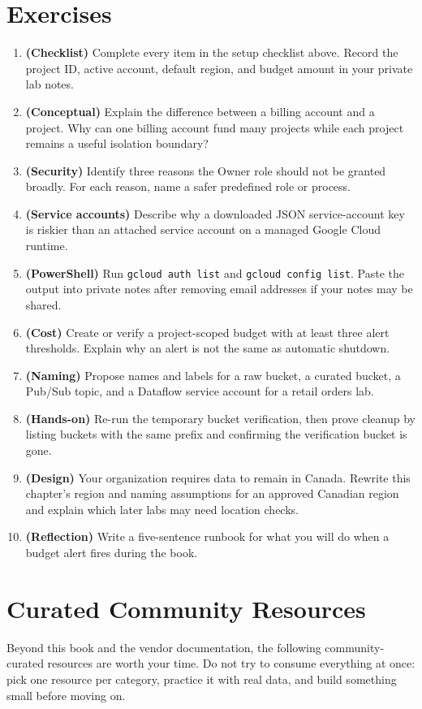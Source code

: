 \section{Exercises}
\begin{enumerate}
    \item \textbf{(Checklist)} Complete every item in the setup checklist above. Record the project ID, active account, default region, and budget amount in your private lab notes.
    \item \textbf{(Conceptual)} Explain the difference between a billing account and a project. Why can one billing account fund many projects while each project remains a useful isolation boundary?
    \item \textbf{(Security)} Identify three reasons the Owner role should not be granted broadly. For each reason, name a safer predefined role or process.
    \item \textbf{(Service accounts)} Describe why a downloaded JSON service-account key is riskier than an attached service account on a managed Google Cloud runtime.
    \item \textbf{(PowerShell)} Run \texttt{gcloud auth list} and \texttt{gcloud config list}. Paste the output into private notes after removing email addresses if your notes may be shared.
    \item \textbf{(Cost)} Create or verify a project-scoped budget with at least three alert thresholds. Explain why an alert is not the same as automatic shutdown.
    \item \textbf{(Naming)} Propose names and labels for a raw bucket, a curated bucket, a Pub/Sub topic, and a Dataflow service account for a retail orders lab.
    \item \textbf{(Hands-on)} Re-run the temporary bucket verification, then prove cleanup by listing buckets with the same prefix and confirming the verification bucket is gone.
    \item \textbf{(Design)} Your organization requires data to remain in Canada. Rewrite this chapter's region and naming assumptions for an approved Canadian region and explain which later labs may need location checks.
    \item \textbf{(Reflection)} Write a five-sentence runbook for what you will do when a budget alert fires during the book.
\end{enumerate}

\section{Curated Community Resources}
%
Beyond this book and the vendor documentation, the following community-curated resources are worth your time. Do not try to consume everything at once: pick one resource per category, practice it with real data, and build something small before moving on.

